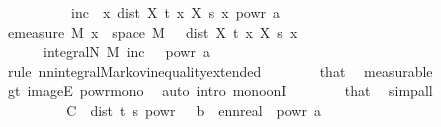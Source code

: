\begin{isabellebody}
\ \ \isamarkupfalse%
\ {\isacharminus}{\kern0pt}\isanewline
\ \ \ \ \isamarkupfalse%
\ {\isacharquery}{\kern0pt}inc\ {\isacharequal}{\kern0pt}\ {\isachardoublequoteopen}{\isasymlambda}x{\isachardot}{\kern0pt}\ dist\ {\isacharparenleft}{\kern0pt}X\ t\ x{\isacharparenright}{\kern0pt}\ {\isacharparenleft}{\kern0pt}X\ s\ x{\isacharparenright}{\kern0pt}\ powr\ a{\isachardoublequoteclose}\isanewline
\ \ \ \ \isamarkupfalse%
\ {\isachardoublequoteopen}emeasure\ {\isacharquery}{\kern0pt}M\ {\isacharbraceleft}{\kern0pt}x\ {\isasymin}\ space\ {\isacharquery}{\kern0pt}M{\isachardot}{\kern0pt}\ {\isasymepsilon}\ {\isasymle}\ dist\ {\isacharparenleft}{\kern0pt}X\ t\ x{\isacharparenright}{\kern0pt}\ {\isacharparenleft}{\kern0pt}X\ s\ x{\isacharparenright}{\kern0pt}{\isacharbraceright}{\kern0pt}\isanewline
\ \ \ \ \ {\isasymle}\ integral\isactrlsup N\ {\isacharquery}{\kern0pt}M\ {\isacharquery}{\kern0pt}inc\ {\isacharslash}{\kern0pt}\ {\isasymepsilon}\ powr\ a{\isachardoublequoteclose}\isanewline
\ \ \ \ \ \ \isamarkupfalse%
\ {\isacharparenleft}{\kern0pt}rule\ nn{\isacharunderscore}{\kern0pt}integral{\isacharunderscore}{\kern0pt}Markov{\isacharunderscore}{\kern0pt}inequality{\isacharunderscore}{\kern0pt}extended{\isacharparenright}{\kern0pt}\isanewline
\ \ \ \ \ \ \isamarkupfalse%
\ that{\isacharparenleft}{\kern0pt}{}{\isacharcomma}{\kern0pt}{}{\isacharparenright}{\kern0pt}\ \isamarkupfalse%
\ measurable\isanewline
\ \ \ \ \ \ \isamarkupfalse%
\ gt{\isacharunderscore}{\kern0pt}{}{\isacharparenleft}{\kern0pt}{}{\isacharparenright}{\kern0pt}\ imageE\ powr{\isacharunderscore}{\kern0pt}mono{}\ \isamarkupfalse%
\ {\isacharparenleft}{\kern0pt}auto\ intro{\isacharcolon}{\kern0pt}\ mono{\isacharunderscore}{\kern0pt}onI{\isacharparenright}{\kern0pt}{\isacharbrackleft}{\kern0pt}{}{\isacharbrackright}{\kern0pt}\isanewline
\ \ \ \ \ \ \isamarkupfalse%
\ that\ \isamarkupfalse%
\ simp{\isacharunderscore}{\kern0pt}all\isanewline
\ \ \ \ \ \ \isamarkupfalse%
\isanewline
\ \ \ \ \isamarkupfalse%
\ \isamarkupfalse%
\ {\isachardoublequoteopen}{\isachardot}{\kern0pt}{\isachardot}{\kern0pt}{\isachardot}{\kern0pt}\ {\isasymle}\ {\isacharparenleft}{\kern0pt}C\ {\isacharasterisk}{\kern0pt}\ dist\ t\ s\ powr\ {\isacharparenleft}{\kern0pt}{}\ {\isacharplus}{\kern0pt}\ b{\isacharparenright}{\kern0pt}{\isacharparenright}{\kern0pt}\ {\isacharslash}{\kern0pt}\ ennreal\ {\isacharparenleft}{\kern0pt}{\isasymepsilon}\ powr\ a{\isacharparenright}{\kern0pt}{\isachardoublequoteclose}\isanewline

\end{isabellebody}
